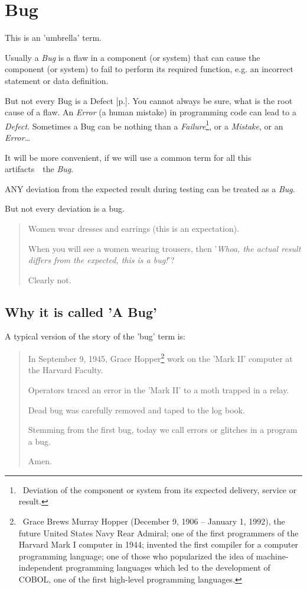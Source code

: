\section{Bug}
\label{sec:Bug}

This is an 'umbrella' term.

Usually a \emph{Bug} is a flaw in a component (or system) that can cause the component (or system) to fail to perform its required function, e.g. an incorrect statement or data definition.

But not every Bug is a Defect [p.\pageref{sec:Defect}]. You cannot always be sure, what is the root cause of a flaw. An \emph{Error} (a human mistake) in programming code can lead to a \emph{Defect}. Sometimes a Bug can be nothing than a \emph{Failure}\footnote{~Deviation of the component or system from its expected delivery, service or result.}, or a \emph{Mistake}, or an \emph{Error}\ldots 

It will be more convenient, if we will use a common term for all this artifacts~\textemdash~the \emph{Bug}.

ANY deviation from the expected result during testing can be treated as a \emph{Bug}. 

But not every deviation is a bug.

\begin{quote}
Women wear dresses and earrings (this is an expectation). 

When you will see a women wearing trousers, then '\textit{Whoa, the actual result differs from the expected, this is a bug!}'? 

Clearly not.
\end{quote} 

\subsection{Why it is called 'A Bug'}

A typical version of the story of the 'bug' term is:

\begin{quote}
In September 9, 1945, Grace Hopper\footnote{~Grace Brews Murray Hopper (December 9, 1906 – January 1, 1992), the future United States Navy Rear Admiral; one of the first programmers of the Harvard Mark I computer in 1944; invented the first compiler for a computer programming language; one of those who popularized the idea of machine-independent programming languages which led to the development of COBOL, one of the first high-level programming languages.} work on the 'Mark II' computer at the Harvard Faculty.

Operators traced an error in the 'Mark II' to a moth trapped in a relay. 

Dead bug was carefully removed and taped to the log book. 

Stemming from the first bug, today we call errors or glitches in a program a bug.

Amen.
\end{quote} 

